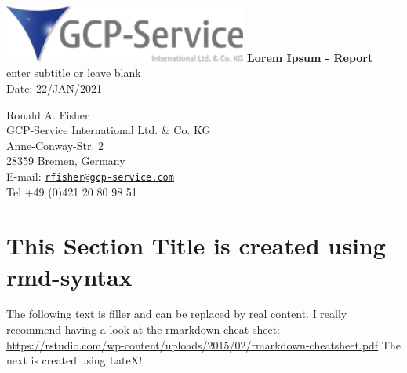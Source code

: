 \documentclass[oneside, 12pt, a4paper]{article}
\begin{document}
\begin{titlepage}
   \begin{center}
    \includegraphics[width=0.6\textwidth]{gpc-service-logo.png}
       \vspace*{1cm}
        \vfill
        \huge
        \textbf{Lorem Ipsum - Report} \\
        \large
        \vspace{0.5cm}
        enter subtitle or leave blank\\
        \vspace{0.5cm}
        Date: 22/JAN/2021\\
        \vspace{1.5cm}
        \vfill
        \vspace{0.8cm}

\begin{flushleft}
Ronald A. Fisher\\
GCP-Service International Ltd. \& Co. KG \\
Anne-Conway-Str. 2 \\
28359 Bremen, Germany \\
E-mail: \href{mailto:rfisher@gcp-service.com}{\nolinkurl{rfisher@gcp-service.com}}\\
Tel +49 (0)421 20 80 98 51
\end{flushleft}
\end{center}

\end{titlepage}

\tableofcontents
\newpage
\listoffigures
\newpage

\hypertarget{this-section-title-is-created-using-rmd-syntax}{%
\section{This Section Title is created using
rmd-syntax}\label{this-section-title-is-created-using-rmd-syntax}}

The following text is filler and can be replaced by real content. I
really recommend having a look at the rmarkdown cheat sheet:
\url{https://rstudio.com/wp-content/uploads/2015/02/rmarkdown-cheatsheet.pdf}
The next is created using LateX!
\end{document}
